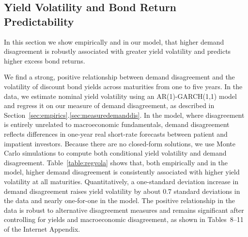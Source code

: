 \documentclass[preprint,11pt,authoryear]{elsarticle}
\theoremstyle{plain}
\begin{document}
 
 





\subsection{Yield Volatility and Bond Return Predictability}\label{sec:YieldVolaANDPredictability}

In this section we show empirically and in our model, that higher demand disagreement is robustly associated with greater yield volatility and predicts higher excess bond returns. 


We find a strong, positive relationship between demand disagreement and the volatility of discount bond yields across maturities from one to five years. In the data, we estimate nominal yield volatility using an AR(1)-GARCH(1,1) model and regress it on our measure of demand disagreement, as described in Section~\ref{sec:empirics}.\ref{sec:measuredemanddis}. In the model, where disagreement is entirely unrelated to macroeconomic fundamentals, demand disagreement reflects differences in one-year real short-rate forecasts between patient and impatient investors. Because there are no closed-form solutions, we use Monte Carlo simulations to compute both conditional yield volatility and demand disagreement. Table~\ref{table:regvola} shows that, both empirically and in the model, higher demand disagreement is consistently associated with higher yield volatility at all maturities. Quantitatively, a one-standard deviation increase in demand disagreement raises yield volatility by about 0.7 standard deviations in the data and nearly one-for-one in the model. The positive relationship in the data is robust to alternative disagreement measures and remains significant after controlling for yields and macroeconomic disagreement, as shown in Tables~8–11 of the Internet Appendix.
\end{document}
